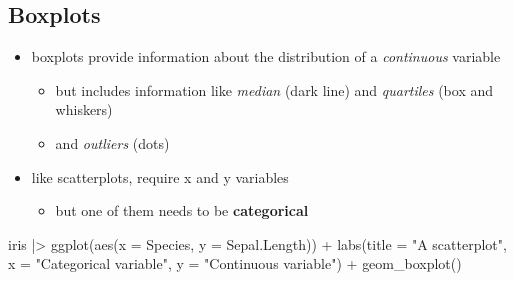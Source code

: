 \documentclass[
  letterpaper,
  DIV=11,
  numbers=noendperiod]{scrartcl}
\newenvironment{Shaded}{\begin{snugshade}}{\end{snugshade}}
\newcommand{\AttributeTok}[1]{\textcolor[rgb]{0.40,0.45,0.13}{#1}}
\newcommand{\FunctionTok}[1]{\textcolor[rgb]{0.28,0.35,0.67}{#1}}
\newcommand{\NormalTok}[1]{\textcolor[rgb]{0.00,0.23,0.31}{#1}}
\newcommand{\SpecialCharTok}[1]{\textcolor[rgb]{0.37,0.37,0.37}{#1}}
\newcommand{\StringTok}[1]{\textcolor[rgb]{0.13,0.47,0.30}{#1}}
\providecommand{\tightlist}{%
  \setlength{\itemsep}{0pt}\setlength{\parskip}{0pt}}\usepackage{longtable,booktabs,array}
\begin{document}
\hypertarget{boxplots}{%
\subsection{Boxplots}\label{boxplots}}

\begin{itemize}
\tightlist
\item
  boxplots provide information about the distribution of a
  \emph{continuous} variable

  \begin{itemize}
  \tightlist
  \item
    but includes information like \emph{median} (dark line) and
    \emph{quartiles} (box and whiskers)
  \item
    and \emph{outliers} (dots)
  \end{itemize}
\item
  like scatterplots, require x and y variables

  \begin{itemize}
  \tightlist
  \item
    but one of them needs to be \textbf{categorical}
  \end{itemize}
\end{itemize}

\begin{Shaded}
\begin{Highlighting}[]
\NormalTok{iris }\SpecialCharTok{|\textgreater{}} 
  \FunctionTok{ggplot}\NormalTok{(}\FunctionTok{aes}\NormalTok{(}\AttributeTok{x =}\NormalTok{ Species, }\AttributeTok{y =}\NormalTok{ Sepal.Length)) }\SpecialCharTok{+}
  \FunctionTok{labs}\NormalTok{(}\AttributeTok{title =} \StringTok{"A scatterplot"}\NormalTok{,}
       \AttributeTok{x =} \StringTok{"Categorical variable"}\NormalTok{,}
       \AttributeTok{y =} \StringTok{"Continuous variable"}\NormalTok{) }\SpecialCharTok{+}
  \FunctionTok{geom\_boxplot}\NormalTok{()}
\end{Highlighting}
\end{Shaded}
\end{document}
